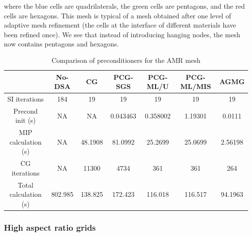 where the blue cells are quadrilaterals, the green cells are pentagons, and
the red cells are hexagons. This mesh is typical of a mesh obtained after one 
level of adaptive mesh
refinement (the cells at the interface of different materials have been refined
once). We see that instead of introducing hanging nodes, the mesh now contains 
pentagons and hexagons.
\begin{table}[H]
  \caption{Comparison of preconditioners for the AMR mesh}
  \begin{center}
    \begin{tabular}{|c|c|c|c|c|c|c|}
      \hline
       & No-DSA & CG & PCG-SGS & PCG-ML/U & PCG-ML/MIS & AGMG \\
      \hline
   SI iterations & 184     & 19      & 19       & 19      & 19       & 19 \\
Precond init (s) & NA      & NA      & 0.043463 & 0.358002 & 1.19301 & 0.0111\\
MIP calculation (s) & NA   & 48.1908 & 81.0992  & 25.2699 & 25.0699  & 
      2.56198\\
   CG iterations & NA      & 11300   & 4734     & 361     & 361      & 264 \\
     Total calculation (s) & 802.985 & 138.825 & 172.423  & 116.018 & 116.517  &
      94.1963\\
      \hline
    \end{tabular}
    \label{table_amr}
  \end{center}
\end{table}

\subsubsection{High aspect ratio grids}

